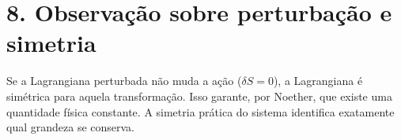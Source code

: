 \documentclass[12pt]{article}
\begin{document}
\section*{8. Observação sobre perturbação e simetria}

Se a Lagrangiana perturbada não muda a ação ($\delta S = 0$), a Lagrangiana é simétrica para aquela transformação. Isso garante, por Noether, que existe uma quantidade física constante. A simetria prática do sistema identifica exatamente qual grandeza se conserva.
\end{document}
